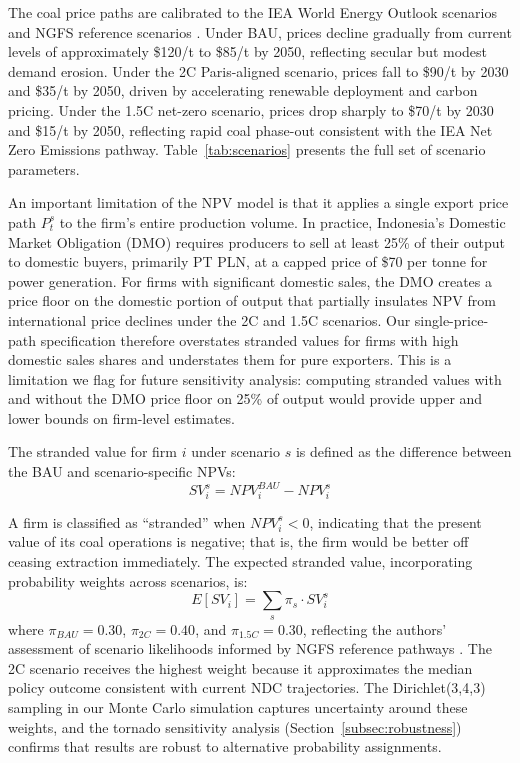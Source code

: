 The coal price paths are calibrated to the IEA World Energy Outlook scenarios \citep{IEA2023} and NGFS reference scenarios \citep{NGFS2022}. Under BAU, prices decline gradually from current levels of approximately \$120/t to \$85/t by 2050, reflecting secular but modest demand erosion. Under the 2\textdegree C Paris-aligned scenario, prices fall to \$90/t by 2030 and \$35/t by 2050, driven by accelerating renewable deployment and carbon pricing. Under the 1.5\textdegree C net-zero scenario, prices drop sharply to \$70/t by 2030 and \$15/t by 2050, reflecting rapid coal phase-out consistent with the IEA Net Zero Emissions pathway. Table~\ref{tab:scenarios} presents the full set of scenario parameters.



An important limitation of the NPV model is that it applies a single export price path $P_t^s$ to the firm's entire production volume. In practice, Indonesia's Domestic Market Obligation (DMO) requires producers to sell at least 25\% of their output to domestic buyers, primarily PT PLN, at a capped price of \$70 per tonne for power generation. For firms with significant domestic sales, the DMO creates a price floor on the domestic portion of output that partially insulates NPV from international price declines under the 2\textdegree C and 1.5\textdegree C scenarios. Our single-price-path specification therefore overstates stranded values for firms with high domestic sales shares and understates them for pure exporters. This is a limitation we flag for future sensitivity analysis: computing stranded values with and without the DMO price floor on 25\% of output would provide upper and lower bounds on firm-level estimates.

The stranded value for firm $i$ under scenario $s$ is defined as the difference between the BAU and scenario-specific NPVs:
\begin{equation}
\label{eq:sv}
SV_i^s = NPV_i^{BAU} - NPV_i^s
\end{equation}

A firm is classified as ``stranded'' when $NPV_i^s < 0$, indicating that the present value of its coal operations is negative; that is, the firm would be better off ceasing extraction immediately. The expected stranded value, incorporating probability weights across scenarios, is:
\begin{equation}
\label{eq:expected_sv}
E[SV_i] = \sum_{s} \pi_s \cdot SV_i^s
\end{equation}
where $\pi_{BAU} = 0.30$, $\pi_{2C} = 0.40$, and $\pi_{1.5C} = 0.30$, reflecting the authors' assessment of scenario likelihoods informed by NGFS reference pathways \citep{NGFS2022}. The 2\textdegree C scenario receives the highest weight because it approximates the median policy outcome consistent with current NDC trajectories. The Dirichlet(3,4,3) sampling in our Monte Carlo simulation captures uncertainty around these weights, and the tornado sensitivity analysis (Section~\ref{subsec:robustness}) confirms that results are robust to alternative probability assignments.



